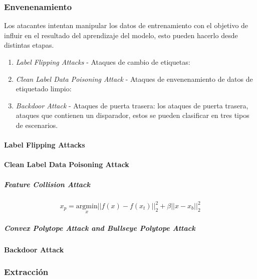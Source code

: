 \subsubsection{Envenenamiento}

Los atacantes intentan manipular los datos de entrenamiento con el objetivo de influir en el resultado del aprendizaje del modelo, esto pueden hacerlo desde distintas etapas.


\begin{enumerate}
    \item \textit{Label Flipping Attacks} - Ataques de cambio de etiquetas:
    \item \textit{Clean Label Data Poisoning Attack} - Ataques de envenenamiento de datos de etiquetado limpio:
    \item \textit{Backdoor Attack} - Ataques de puerta trasera: los ataques de puerta trasera, ataques que contienen un disparador, estos se pueden clasificar en tres tipos de escenarios.
\end{enumerate}

\paragraph{Label Flipping Attacks}

\paragraph{Clean Label Data Poisoning Attack}

\subparagraph{Feature Collision Attack}

\begin{equation}
    x_{p}={\underset{x}{\mathrm{argmin}}}||f\left(x\right)-f\left(x_{t}\right)||_{2}^{2}+\beta||x-x_{b}||_{2}^{2}
\end{equation}


\subparagraph{Convex Polytope Attack and Bullseye Polytope Attack}

\paragraph{Backdoor Attack}


\subsubsection{Extracción}

